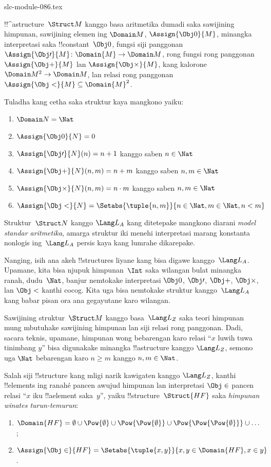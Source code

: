 \begin{filecontents*}[overwrite]{slc-module-086.tex}
\begin{ex}
!!^a{structure}~$\Struct M$ kanggo basa aritmetika dumadi saka
sawijining himpunan, sawijining elemen ing $\Domain M$,
$\Assign{\Obj 0}{M}$, minangka interpretasi saka !!{constant}~$\Obj 0$,
fungsi siji panggonan $\Assign{\Obj \prime}{M} \colon \Domain{M} \to
\Domain M$, rong fungsi rong panggonan $\Assign{\Obj +}{M}$ lan
$\Assign{\Obj \times}{M}$, kang kalorone $\Domain M^2 \to \Domain M$,
lan relasi rong panggonan $\Assign{\Obj <}{M} \subseteq \Domain{M}^2$.

Tuladha kang cetha saka struktur kaya mangkono yaiku:
\begin{enumerate}
\item $\Domain N = \Nat$
\item $\Assign{\Obj 0}{N} = 0$
\item $\Assign{\Obj \prime}{N}(n) = n + 1$ kanggo saben $n \in \Nat$
\item $\Assign{\Obj +}{N}(n, m) = n + m$ kanggo saben $n, m \in \Nat$
\item $\Assign{\Obj \times}{N}(n, m) = n\cdot m$ kanggo saben $n, m \in \Nat$
\item $\Assign{\Obj <}{N} = \Setabs{\tuple{n, m}}{n \in \Nat, m \in
  \Nat, n < m}$
\end{enumerate}
Struktur~$\Struct N$ kanggo $\Lang L_A$ kang ditetepake mangkono
diarani \emph{model standar aritmetika}, amarga struktur iki menehi
interpretasi marang konstanta nonlogis ing~$\Lang L_A$ persis kaya
kang lumrahe dikarepake.

Nanging, isih ana akeh !!{structure}s liyane kang bisa digawe
kanggo~$\Lang L_A$. Upamane, kita bisa njupuk himpunan~$\Int$
saka wilangan bulat minangka ranah, dudu~$\Nat$, banjur nemtokake
interpretasi $\Obj 0$, $\Obj \prime$, $\Obj +$, $\Obj \times$, lan
$\Obj <$ kanthi cocog. Kita uga bisa nemtokake struktur kanggo~$\Lang L_A$
kang babar pisan ora ana gegayutane karo wilangan.
\end{ex}

\begin{ex}
Sawijining struktur~$\Struct M$ kanggo basa~$\Lang L_Z$ saka teori
himpunan mung mbutuhake sawijining himpunan lan siji relasi rong
panggonan. Dadi, sacara teknis, upamane, himpunan wong bebarengan
karo relasi ``$x$ luwih tuwa tinimbang $y$'' bisa digunakake minangka
!!a{structure} kanggo $\Lang L_Z$, semono uga $\Nat$ bebarengan
karo $n \ge m$ kanggo $n, m \in \Nat$.

Salah siji !!{structure} kang mligi narik kawigaten kanggo $\Lang L_Z$,
kanthi !!{element}s ing ranahé pancen awujud himpunan lan interpretasi
$\Obj \in$ pancen relasi ``$x$ iku !!a{element} saka~$y$'', yaiku
!!{structure}~$\Struct{{HF}}$ saka \emph{himpunan winates turun-temurun}:
\begin{enumerate}
\item $\Domain{{{HF}}} = \emptyset \cup \Pow{\emptyset} \cup
  \Pow{\Pow{\emptyset}} \cup \Pow{\Pow{\Pow{\emptyset}}} \cup \dots$;
\item $\Assign{\Obj \in}{{{HF}}} = \Setabs{\tuple{x, y}}{x, y \in
  \Domain{{{HF}}}, x \in y}$.
\end{enumerate}
\end{ex}


\end{filecontents*}
